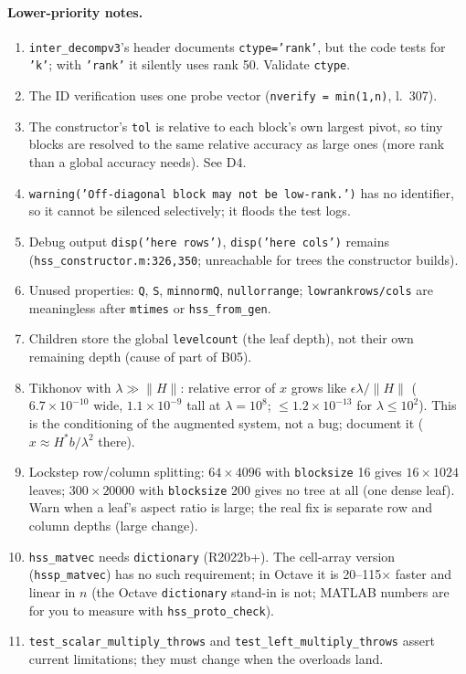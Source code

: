 \documentclass[11pt]{article}
\newcommand{\code}[1]{\texttt{#1}}
\begin{document}
\paragraph{Lower-priority notes.}
\begin{enumerate}[label=N\arabic*.]
\item \code{inter\_decompv3}'s header documents \code{ctype='rank'}, but the code tests for \code{'k'}; with
\code{'rank'} it silently uses rank 50. Validate \code{ctype}.
\item The ID verification uses one probe vector (\code{nverify = min(1,n)}, l.~307).
\item The constructor's \code{tol} is relative to each block's own largest pivot, so tiny blocks are resolved to
the same relative accuracy as large ones (more rank than a global accuracy needs). See D4.
\item \code{warning('Off-diagonal block may not be low-rank.')} has no identifier, so it cannot be silenced
selectively; it floods the test logs.
\item Debug output \code{disp('here rows')}, \code{disp('here cols')} remains (\code{hss\_constructor.m:326,350};
unreachable for trees the constructor builds).
\item Unused properties: \code{Q}, \code{S}, \code{minnormQ}, \code{nullorrange}; \code{lowrankrows/cols} are
meaningless after \code{mtimes} or \code{hss\_from\_gen}.
\item Children store the global \code{levelcount} (the leaf depth), not their own remaining depth (cause of part
of B05).
\item Tikhonov with $\lambda\gg\|H\|$: relative error of $x$ grows like $\epsilon\lambda/\|H\|$ ($6.7\times10^{-10}$ wide, $1.1\times10^{-9}$
tall at $\lambda=10^8$; $\le1.2\times10^{-13}$ for $\lambda\le10^2$). This is the conditioning of the augmented system,
not a bug; document it ($x\approx H^*b/\lambda^2$ there).
\item Lockstep row/column splitting: $64\times4096$ with \code{blocksize} 16 gives $16\times1024$ leaves; $300\times20000$ with
\code{blocksize} 200 gives no tree at all (one dense leaf). Warn when a leaf's aspect ratio is large; the real
fix is separate row and column depths (large change).
\item \code{hss\_matvec} needs \code{dictionary} (R2022b+). The cell-array version (\code{hssp\_matvec}) has no
such requirement; in Octave it is 20--115$\times$ faster and linear in $n$ (the Octave \code{dictionary}
stand-in is not; MATLAB numbers are for you to measure with \code{hss\_proto\_check}).
\item \code{test\_scalar\_multiply\_throws} and \code{test\_left\_multiply\_throws} assert current limitations; they
must change when the overloads land.
\end{enumerate}
\end{document}
